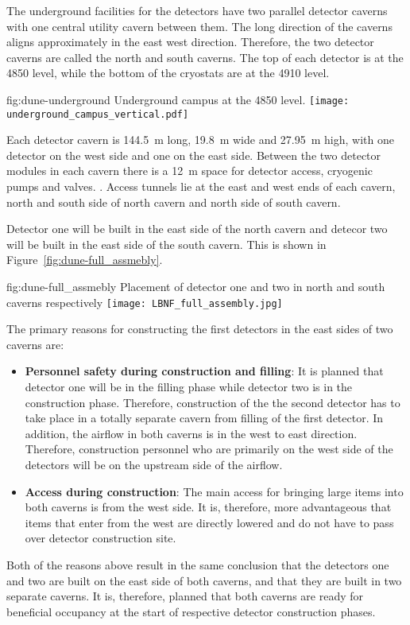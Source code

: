 The underground facilities for the  detectors have two parallel
detector caverns with one central utility cavern between them. The
long direction of the caverns aligns approximately in the 
east west direction. Therefore, the two detector caverns are called the north
and south caverns.  The top of each detector is at the 4850 level, while the bottom of the cryostats are at the 4910 level.
\begin{dunefigure}{fig:dune-underground}
  {Underground campus at the 4850 level.}
  \texttt{[image: underground\_campus\_vertical.pdf]}
\end{dunefigure}
Each detector cavern is \SI{144.5}{\meter} long, \SI{19.8}{\meter}
wide and \SI{27.95}{\meter} high, with one detector on the west side
and one on the east side. Between the two detector modules in each
cavern there is a \SI{12}{\meter} space for detector access, cryogenic pumps and valves.
. Access tunnels lie at the east and
west ends of each cavern, north and south side of north cavern and
north side of south cavern.

Detector one will be built in the east side of the north cavern and
detecor two will be built in the east side of the south cavern. This
is shown in Figure~\ref{fig:dune-full_assmebly}.
\begin{dunefigure}{fig:dune-full_assmebly}
  {Placement of detector one and two in north and south caverns respectively}
  \texttt{[image: LBNF\_full\_assembly.jpg]}
\end{dunefigure}
The primary reasons for constructing the first detectors in the east sides of two caverns are:
\begin{itemize}
\item {\bf Personnel safety during construction and filling}: It is
  planned that detector one will be in the filling phase while detector
  two is in the construction phase. Therefore, construction of the the
  second detector has to take place in a totally separate cavern from
  filling of the first detector. In addition, the airflow in both
  caverns is in the west to east direction. Therefore, construction
  personnel who are primarily on the west side of the detectors will
  be on the upstream side of the airflow.
\item{\bf Access during construction}: The main access for bringing
  large items into both caverns is from the west side. It is,
  therefore, more advantageous that items that enter from the west are
  directly lowered and do not have to pass over detector construction
  site.
\end{itemize}
Both of the reasons above result in the same conclusion that the
detectors one and two are built on the east side of both caverns, and
that they are built in two separate caverns. It is, therefore, planned
that both caverns are ready for beneficial occupancy at the start of
respective detector construction phases.

